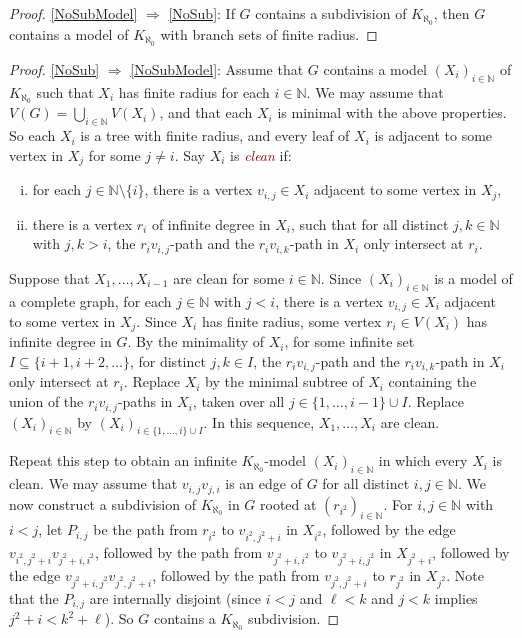 \documentclass[a4paper,11pt]{article}
\newcommand{\defn}[1]{\textcolor{Maroon}{\emph{#1}}\index{#1}}
\theoremstyle{plain}
\theoremstyle{definition}
\newcommand{\NN}{\mathbb{N}}
\begin{document}
\begin{proof}
\cref{NoSubModel} $\Longrightarrow$ \cref{NoSub}: If $G$ contains a subdivision of $K_{\aleph_0}$, then $G$ contains a model of $K_{\aleph_0}$ with branch sets of finite radius. 
\end{proof}

\begin{proof}
\cref{NoSub} $\Longrightarrow$ \cref{NoSubModel}: 
Assume that $G$ contains a model $(X_i)_{i\in\NN}$ of $K_{\aleph_0}$ such that $X_i$ has finite radius for each $i\in\NN$. 
We may assume that $V(G)=\bigcup_{i\in\NN}V(X_i)$, and that each $X_i$ is minimal with the above properties. So each $X_i$ is a tree with finite radius, and every leaf of $X_i$ is adjacent to some vertex in $X_j$ for some $j\neq i$. Say $X_i$ is \defn{clean} if:
\begin{enumerate}[(i)] 
\item for each $j\in\NN\setminus\{i\}$, there is a vertex $v_{i,j}\in X_i$ adjacent to some vertex in $X_j$, 
\item there is a vertex $r_i$ of infinite degree in $X_i$, such that for all distinct $j,k\in\NN$ with $j,k>i$, the $r_iv_{i,j}$-path and the $r_iv_{i,k}$-path in $X_i$ only intersect at $r_i$. 
\end{enumerate}
Suppose that $X_1,\dots,X_{i-1}$ are clean for some $i\in\NN$. 
Since $(X_i)_{i\in\NN}$ is a model of a complete graph, for each $j\in\NN$ with $j<i$, there is a vertex $v_{i,j}\in X_i$ adjacent to some vertex in $X_j$. Since $X_i$ has finite radius, some vertex $r_i\in V(X_i)$ has infinite degree in $G$. By the minimality of $X_i$, for some infinite set $I\subseteq\{i+1,i+2,\dots\}$,  for distinct $j,k\in I$, the $r_iv_{i,j}$-path and the $r_iv_{i,k}$-path in $X_i$ only intersect at $r_i$. Replace $X_i$ by the minimal subtree of $X_i$ containing
the union of the $r_iv_{i,j}$-paths in $X_i$, taken over all $j\in\{1,\dots,i-1\}\cup I$. Replace $(X_i)_{i\in\NN}$ by 
$(X_i)_{i\in\{1,\dots,i\}\cup I}$. 
In this sequence, $X_1,\dots,X_{i}$ are clean. 

Repeat this step to obtain an infinite $K_{\aleph_0}$-model $(X_i)_{i\in\NN}$ in which every $X_i$ is clean. We may assume that $v_{i,j}v_{j,i}$ is an edge of $G$ for all distinct $i,j\in\NN$. 
We now construct a subdivision of $K_{\aleph_0}$ in $G$ rooted at $(r_{i^2})_{i\in\NN}$. 
For $i,j\in\NN$ with $i<j$, let $P_{i,j}$ be the path
from $r_{i^2}$ to $v_{i^2,j^2+i}$ in $X_{i^2}$, 
followed by the edge $v_{i^2,j^2+i}v_{j^2+i,i^2}$,
followed by the path from $v_{j^2+i,i^2}$ to $v_{j^2+i,j^2}$ in $X_{j^2+i}$, 
followed by the edge $v_{j^2+i,j^2}v_{j^2,j^2+i}$,
followed by the path from $v_{j^2,j^2+i}$ to $r_{j^2}$ in $X_{j^2}$. 
Note that the $P_{i,j}$ are internally disjoint
(since $i<j$ and $\ell<k$ and $j<k$ implies $j^2+i<k^2+\ell$). 
So $G$ contains a $K_{\aleph_0}$ subdivision. 
\end{proof}
\end{document}
